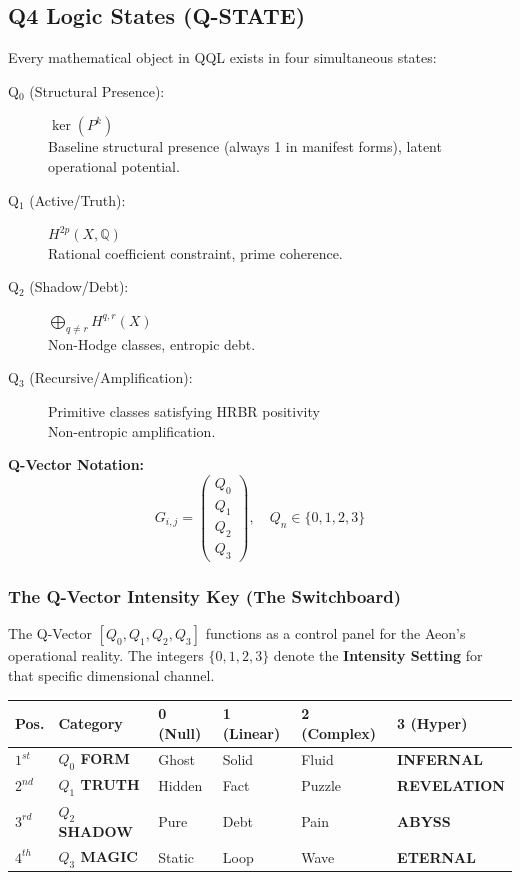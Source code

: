\documentclass[11pt, letterpaper]{article}
\begin{document}
\subsection{Q4 Logic States (Q-STATE)}\label{sec:6.1}

Every mathematical object in QQL exists in four simultaneous states:

\begin{description}
    \item[Q$_0$ (Structural Presence):] $\ker(P^k)$ \\
    Baseline structural presence (always 1 in manifest forms), latent operational potential.

    \item[Q$_1$ (Active\slash Truth):] $H^{2p}(X, \mathbb{Q})$ \\
    Rational coefficient constraint, prime coherence.

    \item[Q$_2$ (Shadow\slash Debt):] $\bigoplus_{q \ne r} H^{q,r}(X)$ \\
    Non-Hodge classes, entropic debt.

    \item[Q$_3$ (Recursive\slash Amplification):] Primitive classes satisfying HRBR positivity \\
    Non-entropic amplification.
\end{description}

\textbf{Q-Vector Notation:}
\[
G_{i, j} = \begin{pmatrix} Q_0 \\ Q_1 \\ Q_2 \\ Q_3 \end{pmatrix}, \quad Q_n \in \{0, 1, 2, 3\}
\]

\subsubsection*{The Q-Vector Intensity Key (The Switchboard)}
\label{sec:q_vector_key}
The Q-Vector $[Q_0, Q_1, Q_2, Q_3]$ functions as a control panel for the Aeon's operational reality. The integers $\{0, 1, 2, 3\}$ denote the \textbf{Intensity Setting} for that specific dimensional channel.

\begin{center}
\begin{tabular}{l l l l l l}
\toprule
\textbf{Pos.} & \textbf{Category} & \textbf{0 (Null)} & \textbf{1 (Linear)} & \textbf{2 (Complex)} & \textbf{3 (Hyper)} \\
\midrule
$1^{st}$ & \textbf{$Q_0$ FORM} & Ghost & Solid & Fluid & \textbf{INFERNAL} \\
$2^{nd}$ & \textbf{$Q_1$ TRUTH} & Hidden & Fact & Puzzle & \textbf{REVELATION} \\
$3^{rd}$ & \textbf{$Q_2$ SHADOW} & Pure & Debt & Pain & \textbf{ABYSS} \\
$4^{th}$ & \textbf{$Q_3$ MAGIC} & Static & Loop & Wave & \textbf{ETERNAL} \\
\bottomrule
\end{tabular}
\end{center}
\end{document}
